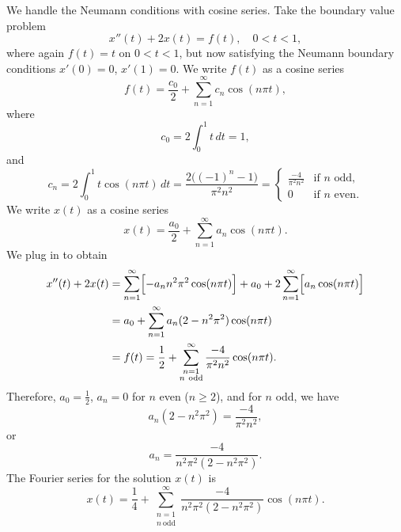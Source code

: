 \begin{example}
We handle the Neumann conditions with cosine series.
Take the boundary value problem
\begin{equation*}
x''(t) + 2 x(t) = f(t) , \quad 0 < t < 1,
\end{equation*}
where again $f(t) = t$ on $0 < t < 1$, but now satisfying
the Neumann boundary conditions
$x'(0) = 0$, $x'(1)=0$.
We write $f(t)$ as a cosine series
\begin{equation*}
f(t) = \frac{c_0}{2} + \sum_{n=1}^\infty c_n \cos (n \pi t) ,
\end{equation*}
where
\begin{equation*}
c_0 = 2 \int_0^1 t \,dt = 1 ,
\end{equation*}
and
\begin{equation*}
c_n = 2 \int_0^1 t \cos (n \pi t) \,dt =
\frac{2\bigl({(-1)}^n-1\bigr)}{\pi^2 n^2} = 
\begin{cases}
\frac{-4}{\pi^2 n^2} & \text{if } n \text{ odd} , \\
0 & \text{if } n \text{ even}.
\end{cases}
\end{equation*}
We write $x(t)$ as a cosine series
\begin{equation*}
x(t) = \frac{a_0}{2} + \sum_{n=1}^\infty a_n \cos (n \pi t) .
\end{equation*}
We plug in to obtain 
\begin{equation*}
\begin{split}
x''(t) + 2 x(t) & =
\sum_{n=1}^\infty \Bigl[ - a_n n^2 \pi^2 \cos (n \pi t) \Bigr]
+
a_0 +
2
\sum_{n=1}^\infty \Bigl[ a_n \cos (n \pi t) \Bigr]
\\
& =
a_0 +
\sum_{n=1}^\infty a_n (2 - n^2 \pi^2 ) \cos (n \pi t)
\\
& = f(t)
=
\frac{1}{2} +
\sum_{\substack{n=1\\n~\text{odd}}}^\infty
\frac{-4}{\pi^2 n^2} \cos (n \pi t) .
\end{split}
\end{equation*}
Therefore,
$a_0 = \frac{1}{2}$,
$a_n = 0$ for $n$ even ($n \geq 2$), and for
$n$ odd, we have
\begin{equation*}
a_n (2 - n^2 \pi^2)
=
\frac{-4}{\pi^2 n^2} ,
\end{equation*}
or
\begin{equation*}
a_n
=
\frac{-4}{n^2 \pi^2 (2 - n^2 \pi^2)} .
\end{equation*}
The Fourier series for the solution $x(t)$ is
\begin{equation*}
x(t) = 
\frac{1}{4} +
\sum_{\substack{n=1\\n~\text{odd}}}^\infty
\frac{-4}{n^2 \pi^2 (2 - n^2 \pi^2)} 
\cos (n \pi t) .
\end{equation*}
\end{example}

